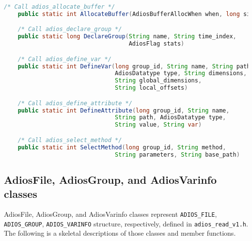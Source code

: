\begin{lstlisting}[language=Java,caption={Member functions in the Adios class},label={}]
    /* Call adios_allocate_buffer */
    public static int AllocateBuffer(AdiosBufferAllocWhen when, long size)

    /* Call adios_declare_group */
    public static long DeclareGroup(String name, String time_index, 
                                    AdiosFlag stats)

    /* Call adios_define_var */
    public static int DefineVar(long group_id, String name, String path, 
                                AdiosDatatype type, String dimensions, 
                                String global_dimensions, 
                                String local_offsets)

    /* Call adios_define_attribute */
    public static int DefineAttribute(long group_id, String name, 
                                String path, AdiosDatatype type, 
                                String value, String var)

    /* Call adios_select_method */
    public static int SelectMethod(long group_id, String method, 
                                String parameters, String base_path)
\end{lstlisting}

\subsection{AdiosFile, AdiosGroup, and AdiosVarinfo classes}
AdiosFile, AdiosGroup, and AdiosVarinfo classes represent \verb+ADIOS_FILE+, \verb+ADIOS_GROUP+, \verb+ADIOS_VARINFO+ structure, respectively, defined in \verb+adios_read_v1.h+. The following is a skeletal descriptions of those classes and member functions.

